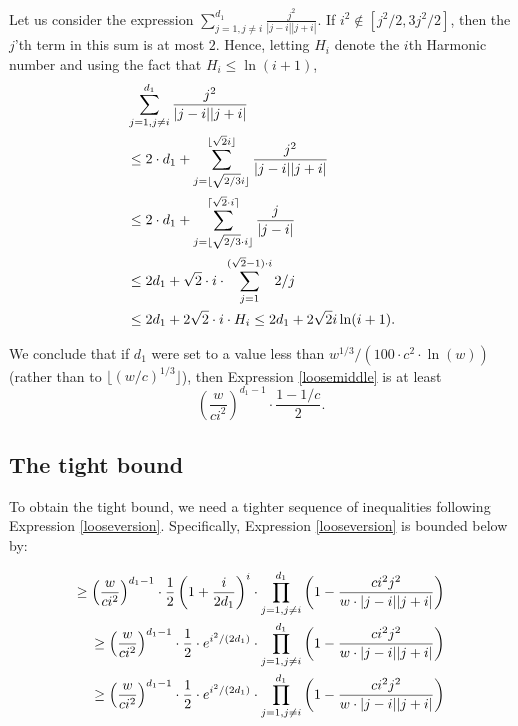 Let us consider the expression $\sum_{j=1, j \neq i }^{d_1}\frac{j^2}{ |j-i|
|j+i|}$. If $i^2 \not \in [j^2/2, 3j^2/2]$, then the $j$'th term in this sum
is at most $2$. Hence, letting $H_i$ denote the $i$th Harmonic number and
using the fact that $H_i \leq \ln(i+1)$,
\begin{align}
& \sum_{j=1, j \neq i }^{d_1}\frac{j^2}{ |j-i| |j+i|}  \notag \\
& \leq 2 \cdot d_1 + \sum_{j = \lfloor \sqrt{2/3} i \rfloor}^{\lfloor \sqrt{2
} i \rfloor} \frac{j^2}{|j-i| |j+i|}  \notag \\
& \leq 2 \cdot d_1 + \sum_{j = \lfloor \sqrt{2/3} \cdot i \rfloor}^{\lceil
\sqrt{2} \cdot i \rceil} \frac{j}{|j-i|}  \notag \\
& \leq 2 d_1 + \sqrt{2} \cdot i \cdot \sum_{j=1}^{(\sqrt{2}-1) \cdot i} 2/j
\notag \\
& \leq 2 d_1 + 2 \sqrt{2} \cdot i \cdot H_{i} \leq 2d_1 + 2 \sqrt{2} i
\ln(i+1).  \label{eq:ieq}
\end{align}

We conclude that if $d_1$ were set to a value less than $w^{1/3}/(100 \cdot
c^2 \cdot \ln(w))$ (rather than to $\lfloor \left(w/c\right)^{1/3}\rfloor$),
then Expression \eqref{loosemiddle} is at least
\begin{equation}
\left(\frac{w}{ci^2}\right)^{d_1-1} \cdot \frac{1-1/c}{2}.
\end{equation}

%
\subsection{The tight bound}

\label{tightsec} To obtain the tight bound, we need a tighter sequence of
inequalities following Expression \eqref{looseversion}. Specifically,
Expression \eqref{looseversion} is bounded below by:

\begin{align}
\geq \left(\frac{w}{ci^2}\right)^{d_1-1} \cdot \frac{1}{2} \left(1+ \frac{i}{
2d_1}\right)^i \cdot \prod_{j=1, j \neq i}^{d_1} \left(1-\frac{c i^2 j^2}{w
\cdot |j-i| |j+i|}\right)  \notag \\
\geq \left(\frac{w}{ci^2}\right)^{d_1-1} \cdot \frac{1}{2} \cdot
e^{i^2/(2d_1)} \cdot \prod_{j=1, j \neq i}^{d_1} \left(1-\frac{c i^2 j^2}{w
\cdot |j-i| |j+i|}\right)  \notag \\
\geq \left(\frac{w}{ci^2}\right)^{d_1-1} \cdot \frac{1}{2} \cdot
e^{i^2/(2d_1)} \cdot \prod_{j=1, j \neq i}^{d_1} \left(1-\frac{c i^2 j^2}{w
\cdot |j-i| |j+i|}\right)  \label{tightbegin}
\end{align}

